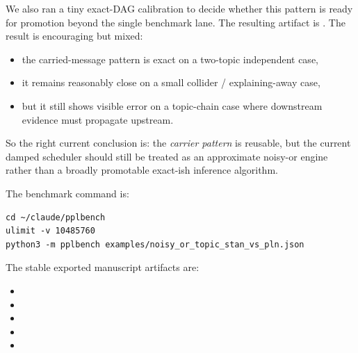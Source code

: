 \documentclass[11pt,openany]{report}
\begin{document}
We also ran a tiny exact-DAG calibration to decide whether this pattern is
ready for promotion beyond the single benchmark lane.  The resulting artifact
is .  The result
is encouraging but mixed:
\begin{itemize}
\item the carried-message pattern is exact on a two-topic independent case,
\item it remains reasonably close on a small collider / explaining-away case,
\item but it still shows visible error on a topic-chain case where downstream
  evidence must propagate upstream.
\end{itemize}
So the right current conclusion is: the \emph{carrier pattern} is reusable, but
the current damped scheduler should still be treated as an approximate noisy-or
engine rather than a broadly promotable exact-ish inference algorithm.

The benchmark command is:
\begin{lstlisting}
cd ~/claude/pplbench
ulimit -v 10485760
python3 -m pplbench examples/noisy_or_topic_stan_vs_pln.json
\end{lstlisting}

The stable exported manuscript artifacts are:
\begin{itemize}
\item {}
\item {}
\item {}
\item {}
\item {}
\end{itemize}

\begin{table}[htbp]
\centering
\caption{Noisy-or upgrade story on the same small PPLBench family.  The
legacy heuristic PLN lane was extremely fast but statistically weak.  The
semantic factor-graph WM-PLN lane is slower, but it closes the predictive-fit
gap dramatically and slightly exceeds Stan on final PLL in this recorded run.}
\label{tab:pplbench-noisy-or-upgrade}
\end{table}
\end{document}
